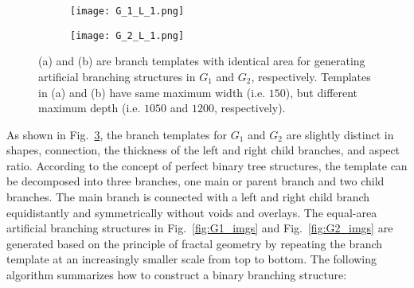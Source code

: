     \begin{figure}
        \centering
        \begin{subfigure}[b]{0.45\textwidth}
          \texttt{[image: G\_1\_L\_1.png]}
          \caption{}
          \label{fig:g1_template}
        \end{subfigure}
        \hfill
        \begin{subfigure}[b]{0.45\textwidth}
          \texttt{[image: G\_2\_L\_1.png]}
          \caption{}
          \label{fig:sf_g2_template}
        \end{subfigure}
        \caption{(a) and (b) are branch templates with identical area
          for generating artificial branching structures in $G_1$ and
          $G_2$, respectively. Templates in (a) and (b) have same
          maximum width (i.e. $150$), but different maximum depth
          (i.e. $1050$ and $1200$, respectively).}
        \label{fig:branch_templates}
    \end{figure}
    



As shown in Fig.~\ref{fig:branch_templates}, the branch templates for
$G_1$ and $G_2$ are slightly distinct in shapes, connection, the
thickness of the left and right child branches, and aspect
ratio. According to the concept of perfect binary tree structures, the
template can be decomposed into three branches, one main or parent
branch and two child branches. The main branch is connected with a
left and right child branch equidistantly and symmetrically without
voids and overlays. The equal-area artificial branching structures in
Fig.~\ref{fig:G1_imgs} and Fig.~\ref{fig:G2_imgs} are generated based
on the principle of fractal geometry \cite{falconer2004fractal} by
repeating the branch template at an increasingly smaller scale from
top to bottom. The following algorithm summarizes how to construct a
binary branching structure:

